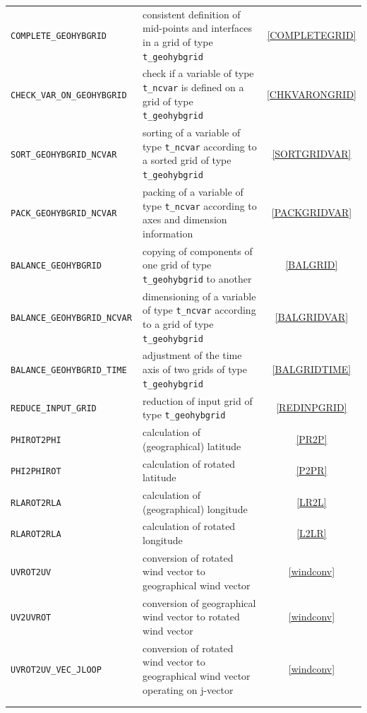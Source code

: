 \documentclass[11pt,twoside]{article}
\begin{document}
\begin{longtable}{|p{5cm}p{8.5cm}c|}
\color{blue} \tt {COMPLETE\_GEOHYBGRID} & consistent definition of
mid-points and interfaces in a grid  of
type \verb|t_geohybgrid| & \ref{COMPLETEGRID}\\
\color{blue} \tt {CHECK\_VAR\_ON\_GEOHYBGRID} & check if a variable of
type \verb|t_ncvar| is defined on a grid of type \verb|t_geohybgrid|
& \ref{CHKVARONGRID}\\ 
\color{blue} \tt {SORT\_GEOHYBGRID\_NCVAR} & sorting of  a variable of
type \verb|t_ncvar| according to a sorted grid of type \verb|t_geohybgrid|
& \ref{SORTGRIDVAR}\\ 
\color{blue} \tt {PACK\_GEOHYBGRID\_NCVAR} & packing of a variable of
type \verb|t_ncvar| according to axes and dimension information 
& \ref{PACKGRIDVAR}\\ 
\color{blue} \tt {BALANCE\_GEOHYBGRID} & copying of components of one
grid of type \verb|t_geohybgrid| to another & \ref{BALGRID}\\ 
\color{blue} \tt {BALANCE\_GEOHYBGRID\_NCVAR} & dimensioning of a
variable of type \verb|t_ncvar| according to a
grid of type \verb|t_geohybgrid| & \ref{BALGRIDVAR}\\ 
\color{blue} \tt {BALANCE\_GEOHYBGRID\_TIME} & adjustment of the time
axis of two grids  of type \verb|t_geohybgrid| & \ref{BALGRIDTIME}\\ 
\color{blue} \tt {REDUCE\_INPUT\_GRID} & reduction of input grid  of type \verb|t_geohybgrid| & \ref{REDINPGRID}\\ 
\color{blue} \tt {PHIROT2PHI} & calculation of (geographical) latitude & \ref{PR2P}\\ 
\color{blue} \tt {PHI2PHIROT} & calculation of rotated latitude & \ref{P2PR}\\ 
\color{blue} \tt {RLAROT2RLA} & calculation of (geographical) longitude & \ref{LR2L}\\ 
\color{blue} \tt {RLAROT2RLA} & calculation of rotated longitude& \ref{L2LR}\\ 
\color{blue} \tt {UVROT2UV} & conversion of rotated wind vector to
geographical wind vector  & \ref{windconv}\\ 
\color{blue} \tt {UV2UVROT} & conversion of geographical wind vector to
rotated wind vector  & \ref{windconv}\\ 
\color{blue} \tt {UVROT2UV\_VEC\_JLOOP} & conversion of rotated wind vector to
geographical wind vector operating on j-vector  & \ref{windconv}\\ 
 & & \\ 
 & & \\ 

\end{longtable}
\end{document}
